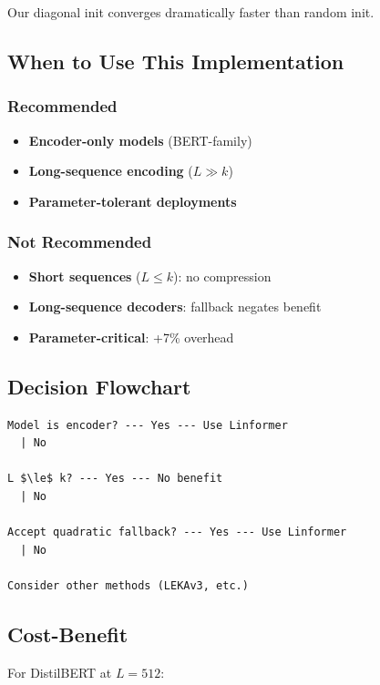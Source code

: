 Our diagonal init converges dramatically faster than random init.

\subsection{When to Use This Implementation}

\subsubsection{Recommended}
\begin{itemize}
\item \textbf{Encoder-only models} (BERT-family)
\item \textbf{Long-sequence encoding} ($L \gg k$)
\item \textbf{Parameter-tolerant deployments}

\end{itemize}
\subsubsection{Not Recommended}
\begin{itemize}
\item \textbf{Short sequences} ($L \leq k$): no compression
\item \textbf{Long-sequence decoders}: fallback negates benefit
\item \textbf{Parameter-critical}: +7\% overhead

\end{itemize}
\subsection{Decision Flowchart}

\begin{lstlisting}
Model is encoder? --- Yes --- Use Linformer
  | No
   
L $\le$ k? --- Yes --- No benefit
  | No
   
Accept quadratic fallback? --- Yes --- Use Linformer
  | No
   
Consider other methods (LEKAv3, etc.)
\end{lstlisting}

\subsection{Cost-Benefit}

For DistilBERT at $L = 512$:


